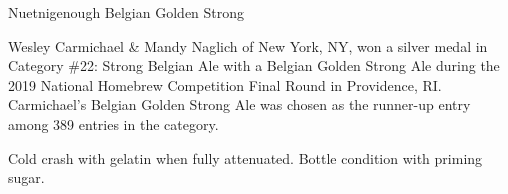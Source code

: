 \stylesection{\stylebelgiangoldenstrongale}

\begin{recipie}{Nuetnigenough Belgian Golden Strong}

\begin{aboutblock}
Wesley Carmichael \& Mandy Naglich of New York, NY, won a silver medal in
Category \#22: Strong Belgian Ale with a Belgian Golden Strong Ale during the
2019 National Homebrew Competition Final Round in Providence, RI. Carmichael's
Belgian Golden Strong Ale was chosen as the runner-up entry among 389 entries
in the category.
\end{aboutblock}


\begin{methodandtiming}
 
\begin{mashsteps}
\end{mashsteps}

\begin{fermentationsteps}
\end{fermentationsteps}

\begin{directions}
Cold crash with gelatin when fully attenuated. Bottle condition with priming
sugar.
\end{directions}

\end{methodandtiming}

\pagebreak

\begin{ingredientsblock}

\begin{malts}
\end{malts}

\begin{hops}
\end{hops}

\begin{yeasts}
\end{yeasts}

\end{ingredientsblock}

\end{recipie}
